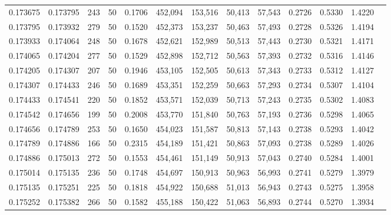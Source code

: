 \begin{tabular}{rrrrrrrrrrrrr}
0.173675 & 0.173795 &   243 &  50 &                                     0.1706 & 452,094 & 153,516 &  50,413 &  57,543 & 0.2726 & 0.5330 & 1.4220 \\
0.173795 & 0.173932 &   279 &  50 &                                     0.1520 & 452,373 & 153,237 &  50,463 &  57,493 & 0.2728 & 0.5326 & 1.4194 \\
0.173933 & 0.174064 &   248 &  50 &                                     0.1678 & 452,621 & 152,989 &  50,513 &  57,443 & 0.2730 & 0.5321 & 1.4171 \\
0.174065 & 0.174204 &   277 &  50 &                                     0.1529 & 452,898 & 152,712 &  50,563 &  57,393 & 0.2732 & 0.5316 & 1.4146 \\
0.174205 & 0.174307 &   207 &  50 &                                     0.1946 & 453,105 & 152,505 &  50,613 &  57,343 & 0.2733 & 0.5312 & 1.4127 \\
0.174307 & 0.174433 &   246 &  50 &                                     0.1689 & 453,351 & 152,259 &  50,663 &  57,293 & 0.2734 & 0.5307 & 1.4104 \\
0.174433 & 0.174541 &   220 &  50 &                                     0.1852 & 453,571 & 152,039 &  50,713 &  57,243 & 0.2735 & 0.5302 & 1.4083 \\
0.174542 & 0.174656 &   199 &  50 &                                     0.2008 & 453,770 & 151,840 &  50,763 &  57,193 & 0.2736 & 0.5298 & 1.4065 \\
0.174656 & 0.174789 &   253 &  50 &                                     0.1650 & 454,023 & 151,587 &  50,813 &  57,143 & 0.2738 & 0.5293 & 1.4042 \\
0.174789 & 0.174886 &   166 &  50 &                                     0.2315 & 454,189 & 151,421 &  50,863 &  57,093 & 0.2738 & 0.5289 & 1.4026 \\
0.174886 & 0.175013 &   272 &  50 &                                     0.1553 & 454,461 & 151,149 &  50,913 &  57,043 & 0.2740 & 0.5284 & 1.4001 \\
0.175014 & 0.175135 &   236 &  50 &                                     0.1748 & 454,697 & 150,913 &  50,963 &  56,993 & 0.2741 & 0.5279 & 1.3979 \\
0.175135 & 0.175251 &   225 &  50 &                                     0.1818 & 454,922 & 150,688 &  51,013 &  56,943 & 0.2743 & 0.5275 & 1.3958 \\
0.175252 & 0.175382 &   266 &  50 &                                     0.1582 & 455,188 & 150,422 &  51,063 &  56,893 & 0.2744 & 0.5270 & 1.3934 \\

\end{tabular}
